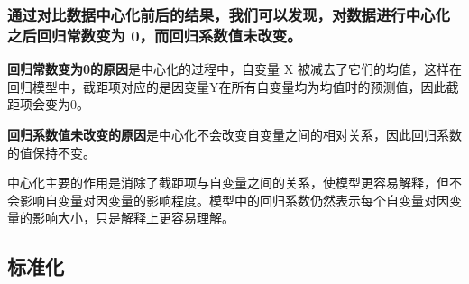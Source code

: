 \documentclass[11pt]{article}
\begin{document}
    \hypertarget{ux901aux8fc7ux5bf9ux6bd4ux6570ux636eux4e2dux5fc3ux5316ux524dux540eux7684ux7ed3ux679cux6211ux4eecux53efux4ee5ux53d1ux73b0ux5bf9ux6570ux636eux8fdbux884cux4e2dux5fc3ux5316ux4e4bux540eux56deux5f52ux5e38ux6570ux53d8ux4e3a-0ux800cux56deux5f52ux7cfbux6570ux503cux672aux6539ux53d8}{%
\subsubsection{通过对比数据中心化前后的结果，我们可以发现，对数据进行中心化之后回归常数变为
0，而回归系数值未改变。}\label{ux901aux8fc7ux5bf9ux6bd4ux6570ux636eux4e2dux5fc3ux5316ux524dux540eux7684ux7ed3ux679cux6211ux4eecux53efux4ee5ux53d1ux73b0ux5bf9ux6570ux636eux8fdbux884cux4e2dux5fc3ux5316ux4e4bux540eux56deux5f52ux5e38ux6570ux53d8ux4e3a-0ux800cux56deux5f52ux7cfbux6570ux503cux672aux6539ux53d8}}

\textbf{回归常数变为0的原因}是中心化的过程中，自变量 X
被减去了它们的均值，这样在回归模型中，截距项对应的是因变量Y在所有自变量均为均值时的预测值，因此截距项会变为0。

\textbf{回归系数值未改变的原因}是中心化不会改变自变量之间的相对关系，因此回归系数的值保持不变。

中心化主要的作用是消除了截距项与自变量之间的关系，使模型更容易解释，但不会影响自变量对因变量的影响程度。模型中的回归系数仍然表示每个自变量对因变量的影响大小，只是解释上更容易理解。

    \hypertarget{ux6807ux51c6ux5316}{%
\subsection{标准化}\label{ux6807ux51c6ux5316}}
\end{document}
